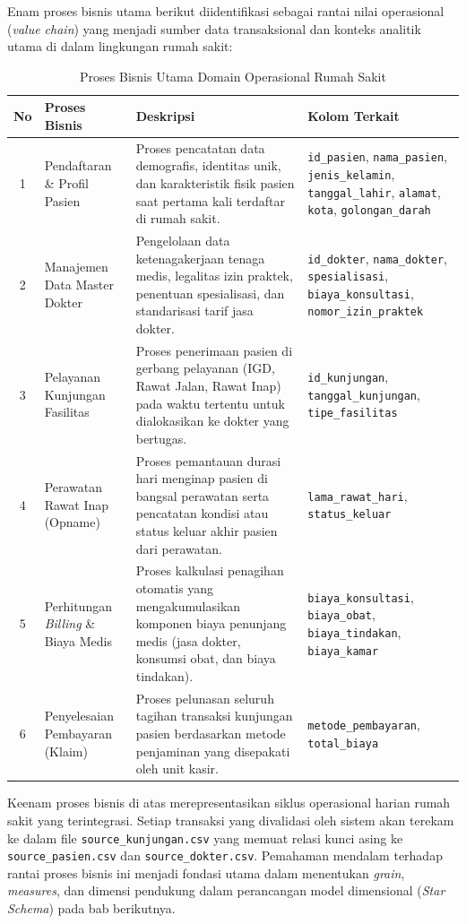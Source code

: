 Enam proses bisnis utama berikut diidentifikasi sebagai rantai nilai operasional (\textit{value chain}) yang menjadi sumber data transaksional dan konteks analitik utama di dalam lingkungan rumah sakit:
 
\begin{table}[H]
\centering
\caption{Proses Bisnis Utama Domain Operasional Rumah Sakit}
\small
\begin{tabularx}{\linewidth}{cp{3cm}Xp{4cm}}
\toprule
\textbf{No} & \textbf{Proses Bisnis} & \textbf{Deskripsi} & \textbf{Kolom Terkait} \\
\midrule
1 & Pendaftaran \& Profil Pasien
  & Proses pencatatan data demografis, identitas unik, dan karakteristik fisik pasien saat pertama kali terdaftar di rumah sakit.
  & \texttt{id\_pasien}, \texttt{nama\_pasien}, \texttt{jenis\_kelamin}, \texttt{tanggal\_lahir}, \texttt{alamat}, \texttt{kota}, \texttt{golongan\_darah} \\[3pt]
2 & Manajemen Data Master Dokter
  & Pengelolaan data ketenagakerjaan tenaga medis, legalitas izin praktek, penentuan spesialisasi, dan standarisasi tarif jasa dokter.
  & \texttt{id\_dokter}, \texttt{nama\_dokter}, \texttt{spesialisasi}, \texttt{biaya\_konsultasi}, \texttt{nomor\_izin\_praktek} \\[3pt]
3 & Pelayanan Kunjungan Fasilitas
  & Proses penerimaan pasien di gerbang pelayanan (IGD, Rawat Jalan, Rawat Inap) pada waktu tertentu untuk dialokasikan ke dokter yang bertugas.
  & \texttt{id\_kunjungan}, \texttt{tanggal\_kunjungan}, \texttt{tipe\_fasilitas} \\[3pt]
4 & Perawatan Rawat Inap (Opname)
  & Proses pemantauan durasi hari menginap pasien di bangsal perawatan serta pencatatan kondisi atau status keluar akhir pasien dari perawatan.
  & \texttt{lama\_rawat\_hari}, \texttt{status\_keluar} \\[3pt]
5 & Perhitungan \textit{Billing} \& Biaya Medis
  & Proses kalkulasi penagihan otomatis yang mengakumulasikan komponen biaya penunjang medis (jasa dokter, konsumsi obat, dan biaya tindakan).
  & \texttt{biaya\_konsultasi}, \texttt{biaya\_obat}, \texttt{biaya\_tindakan}, \texttt{biaya\_kamar} \\[3pt]
6 & Penyelesaian Pembayaran (Klaim)
  & Proses pelunasan seluruh tagihan transaksi kunjungan pasien berdasarkan metode penjaminan yang disepakati oleh unit kasir.
  & \texttt{metode\_pembayaran}, \texttt{total\_biaya} \\
\bottomrule
\end{tabularx}
\end{table}
 
Keenam proses bisnis di atas merepresentasikan siklus operasional harian rumah sakit yang terintegrasi. Setiap transaksi yang divalidasi oleh sistem akan terekam ke dalam file \texttt{source\_kunjungan.csv} yang memuat relasi kunci asing ke \texttt{source\_pasien.csv} dan \texttt{source\_dokter.csv}. Pemahaman mendalam terhadap rantai proses bisnis ini menjadi fondasi utama dalam menentukan \textit{grain}, \textit{measures}, dan dimensi pendukung dalam perancangan model dimensional (\textit{Star Schema}) pada bab berikutnya.
